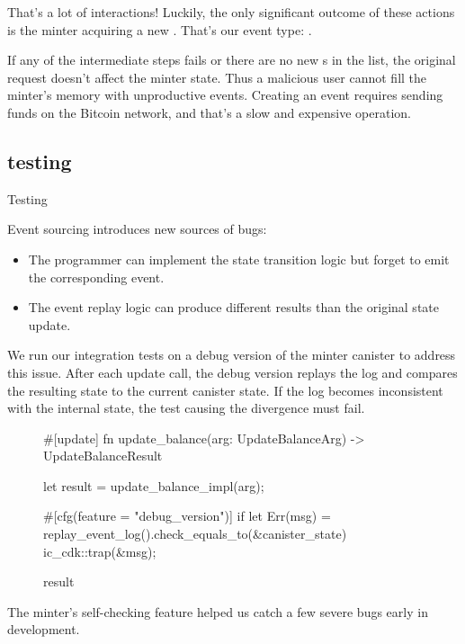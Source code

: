 \documentclass{article}
\begin{document}
That's a lot of interactions!
Luckily, the only significant outcome of these actions is the minter acquiring a new .
That's our event type: .

If any of the intermediate steps fails or there are no new s in the list, the original request doesn't affect the minter state.
Thus a malicious user cannot fill the minter's memory with unproductive events.
Creating an event requires sending funds on the Bitcoin network, and that's a slow and expensive operation.

\subsection{testing}{Testing}

Event sourcing introduces new sources of bugs:

\begin{itemize}
   \item
   The programmer can implement the state transition logic but forget to emit the corresponding event.
   \item
   The event replay logic can produce different results than the original state update.
\end{itemize}

We run our integration tests on a debug version of the minter canister to address this issue.
After each update call, the debug version replays the log and compares the resulting state to the current canister state.
If the log becomes inconsistent with the internal state, the test causing the divergence must fail.

\begin{figure}
\begin{code}[rust]
#[update]
fn update_balance(arg: UpdateBalanceArg) -> UpdateBalanceResult {
    let result = update_balance_impl(arg);

    #[cfg(feature = "debug_version")]
    if let Err(msg) = replay_event_log().check_equals_to(&canister_state) {
      ic_cdk::trap(&msg);
    }

    result
}
\end{code}
\end{figure}

The minter's self-checking feature helped us catch a few severe bugs early in development.
\end{document}
